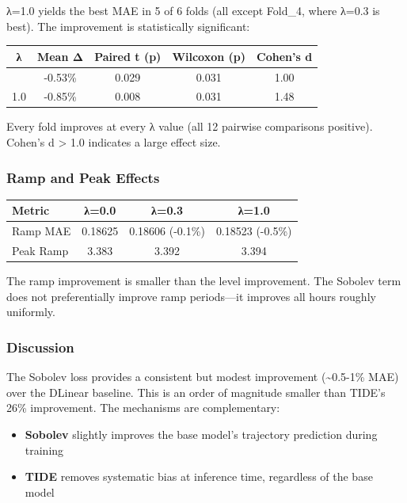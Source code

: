 λ=1.0 yields the best MAE in 5 of 6 folds (all except Fold\_4, where
λ=0.3 is best). The improvement is statistically significant:

{\def\LTcaptype{none} %
\begin{longtable}[]{@{}ccccc@{}}
\toprule\noalign{}
λ & Mean Δ & Paired t (p) & Wilcoxon (p) & Cohen's d \\
\midrule\noalign{}
\endhead
\bottomrule\noalign{}
\endlastfoot
0.3 & -0.53\% & 0.029 & 0.031 & 1.00 \\
1.0 & -0.85\% & 0.008 & 0.031 & 1.48 \\
\end{longtable}
}

Every fold improves at every λ value (all 12 pairwise comparisons
positive). Cohen's d \textgreater{} 1.0 indicates a large effect size.

\subsubsection{Ramp and Peak Effects}\label{ramp-and-peak-effects}

{\def\LTcaptype{none} %
\begin{longtable}[]{@{}lccc@{}}
\toprule\noalign{}
Metric & λ=0.0 & λ=0.3 & λ=1.0 \\
\midrule\noalign{}
\endhead
\bottomrule\noalign{}
\endlastfoot
Ramp MAE & 0.18625 & 0.18606 (-0.1\%) & 0.18523 (-0.5\%) \\
Peak Ramp & 3.383 & 3.392 & 3.394 \\
\end{longtable}
}

The ramp improvement is smaller than the level improvement. The Sobolev
term does not preferentially improve ramp periods---it improves all
hours roughly uniformly.

\subsubsection{Discussion}\label{discussion-1}

The Sobolev loss provides a consistent but modest improvement
(\textasciitilde0.5-1\% MAE) over the DLinear baseline. This is an order
of magnitude smaller than TIDE's 26\% improvement. The mechanisms are
complementary:

\begin{itemize}
\tightlist
\item
  \textbf{Sobolev} slightly improves the base model's trajectory
  prediction during training
\item
  \textbf{TIDE} removes systematic bias at inference time, regardless of
  the base model
\end{itemize}

